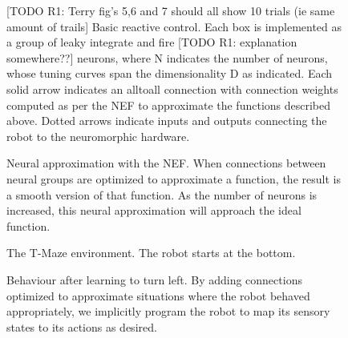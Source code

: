 \documentclass[conference]{IEEEtran}
\begin{document}
\begin{figure}[!t]
\centering
\caption{[TODO R1: Terry fig's 5,6 and 7 should all show 10 trials (ie same amount of trails] Basic reactive control. Each box is implemented as a group of leaky integrate and fire [TODO R1: explanation somewhere??] neurons, where N indicates the number of neurons, whose tuning curves span the dimensionality D as indicated. Each solid arrow indicates an alltoall connection with connection weights computed as per the NEF to approximate the functions described above. Dotted arrows indicate inputs
and outputs connecting the robot to the neuromorphic hardware.}
\label{React}
\end{figure}

\begin{figure}[!t]
\centering
\caption{Neural approximation with the NEF. When connections between neural groups are optimized to approximate a function, the result is a smooth version of that function. As the number of neurons is increased, this neural approximation will approach the ideal function.}
\label{NEF}
\end{figure}


\begin{figure}[!t]
\centering
\caption{The T-Maze environment. The robot starts at the bottom.}
\label{Tmaze}
\end{figure}

\begin{figure}[!t]
\centering
\caption{Behaviour after learning to turn left. By adding connections optimized to approximate situations where the robot behaved appropriately, we implicitly program the robot to map its sensory states to its actions as desired.}
\label{Left}
\end{figure}
\end{document}
